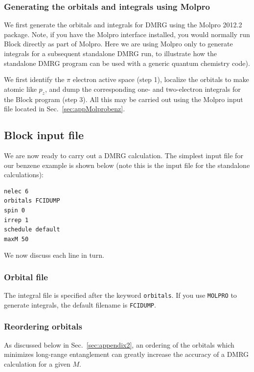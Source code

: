 \documentclass[letterpaper,12pt,aps, pra]{revtex4-1}
\begin{document}

\subsubsection{Generating the orbitals and integrals using Molpro}

We first generate the orbitals and integrals for DMRG using the Molpro 2012.2
package. {Note, if you have the Molpro interface installed, you would normally
run Block directly as part of Molpro. Here we are using Molpro only to generate
integrals for a subsequent standalone DMRG run, to illustrate how the
standalone DMRG program can be used with a generic quantum chemistry code). }

We first identify
the $\pi$ electron active space (step 1), localize the orbitals to make atomic
like $p_z$, and dump the corresponding one- and two-electron integrals for the
Block program (step 3). All this may be carried out using the Molpro input
file located in Sec.~\ref{sec:appMolprobenz}.


\subsection{Block input file}

We are now ready to carry out a DMRG calculation. The simplest input file for our benzene example is shown below (note this is the input file for the standalone calculations):

\begin{verbatim}
nelec 6 
orbitals FCIDUMP
spin 0
irrep 1
schedule default
maxM 50
\end{verbatim}

We now discuss each line in turn.

\subsubsection{Orbital file}
The integral file is specified after the keyword \texttt{orbitals}. 
If you use \texttt{MOLPRO} to generate integrals, the default filename is \texttt{FCIDUMP}.

\subsubsection{Reordering orbitals}
As discussed below in Sec.~\ref{sec:appendix2}, an ordering of the orbitals
which minimizes long-range entanglement can greatly increase the accuracy of a
DMRG calculation for a given $M$. 
\end{document}

